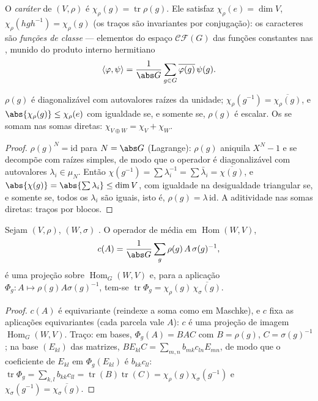 \begin{definition}\label{def:b3:representations:character}
O \emph{caráter} de $(V, \rho)$ é $\chi_\rho(g) = \operatorname{tr}\rho(g)$. Ele satisfaz $\chi_\rho(e) = \dim V$,
$\chi_\rho(hgh^{-1}) = \chi_\rho(g)$ (os traços são invariantes por conjugação): os caracteres são
\emph{funções de classe} --- elementos do
espaço $\mathcal{CF}(G)$ das funções constantes nas , munido do
produto interno hermitiano
\[
\langle \varphi, \psi\rangle = \frac1{\abs G}\sum_{g \in G}
\overline{\varphi(g)}\,\psi(g).
\]
\end{definition}

\begin{proposition}\label{prop:b3:representations:charbasics}
$\rho(g)$ é diagonalizável com autovalores raízes da unidade; $\chi_\rho(g^{-1}) = \overline{\chi_\rho(g)}$, e $\abs{\chi_\rho(g)} \leq \chi_\rho(e)$
com igualdade se, e somente se, $\rho(g)$ é escalar. Os  se somam
nas somas diretas: $\chi_{V
\oplus W} = \chi_V + \chi_W$.
\end{proposition}

\begin{proof}
$\rho(g)^N = \mathrm{id}$ para $N = \abs G$ (Lagrange): $\rho(g)$ aniquila $X^N - 1$ e se decompõe com
raízes simples, de modo que o operador é diagonalizável com autovalores
$\lambda_i \in \mu_N$. Então $\chi(g^{-1}) = \sum \lambda_i^{-1} = \sum\bar\lambda_i =
\overline{\chi(g)}$, e $\abs{\chi(g)} = \abs{\sum\lambda_i}
\leq \dim V$, com igualdade na desigualdade triangular
se, e somente se, todos os $\lambda_i$ são iguais, isto é, $\rho(g) = \lambda\,\mathrm{id}$. A
aditividade nas somas diretas: traços por blocos.
\end{proof}

\begin{lemma}\label{lem:b3:representations:homtrace}
Sejam $(V, \rho)$, $(W, \sigma)$ . O operador de média em $\operatorname{Hom}(W, V)$,
\[
c(A) = \frac1{\abs G}\sum_{g}\rho(g)\,A\,\sigma(g)^{-1},
\]
é uma projeção sobre $\operatorname{Hom}_G(W, V)$ e, para a aplicação $\Phi_g \colon A \mapsto \rho(g)A\sigma(g)^{-1}$, tem-se $\operatorname{tr}\Phi_g =
\chi_\rho(g)\,\overline{\chi_\sigma(g)}$.
\end{lemma}

\begin{proof}
$c(A)$ é equivariante (reindexe a soma como em Maschke), e $c$
fixa as aplicações equivariantes (cada parcela vale $A$): $c$ é
uma projeção de imagem $\operatorname{Hom}_G(W, V)$. Traço: em bases, $\Phi_g(A) = BAC$ com $B = \rho(g)$, $C = \sigma(g)^{-1}$;
na base $(E_{kl})$ das matrizes, $BE_{kl}C = \sum_{m,n}
b_{mk}c_{ln}E_{mn}$, de modo que o coeficiente de
$E_{kl}$ em $\Phi_g(E_{kl})$ é $b_{kk}c_{ll}$: $\operatorname{tr}\Phi_g =
\sum_{k,l}b_{kk}c_{ll} = \operatorname{tr}(B)
\operatorname{tr}(C) = \chi_\rho(g)\chi_\sigma(g^{-1})$ e $\chi_\sigma(g^{-1}) = \overline{\chi_\sigma(g)}$.
\end{proof}

